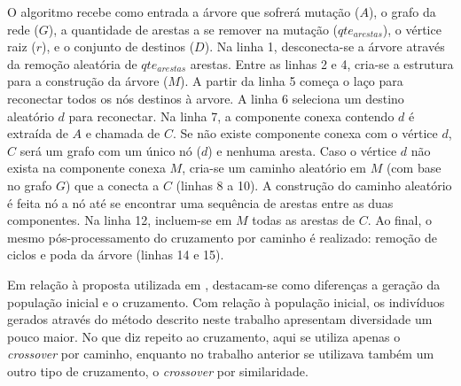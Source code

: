 O algoritmo recebe como entrada a árvore que sofrerá mutação ($A$), o grafo da rede ($G$), a quantidade de arestas a se remover na mutação ($qte_{arestas}$), o vértice raiz ($r$), e o conjunto de destinos ($D$). Na linha 1, desconecta-se a árvore através da remoção aleatória de $qte_{arestas}$ arestas. Entre as linhas 2 e 4, cria-se a estrutura para a construção da árvore ($M$). A partir da linha 5 começa o laço para reconectar todos os nós destinos à arvore. A linha 6 seleciona um destino aleatório $d$ para reconectar. Na linha 7, a componente conexa contendo $d$ é extraída de $A$ e chamada de $C$. Se não existe componente conexa com o vértice $d$, $C$ será um grafo com um único nó ($d$) e nenhuma aresta. Caso o vértice $d$ não exista na componente conexa $M$, cria-se um caminho aleatório em $M$ (com base no grafo $G$) que a conecta a $C$ (linhas 8 a 10). A construção do caminho aleatório é feita nó a nó até se encontrar uma sequência de arestas entre as duas componentes. Na linha 12, incluem-se em $M$ todas as arestas de $C$. Ao final, o mesmo pós-processamento do cruzamento por caminho é realizado: remoção de ciclos e poda da árvore (linhas 14 e 15).

Em relação à proposta utilizada em \cite{LafetaThesis}, destacam-se como diferenças a geração da população inicial e o cruzamento. Com relação à população inicial, os indivíduos gerados através do método descrito neste trabalho apresentam diversidade um pouco maior. No que diz repeito ao cruzamento, aqui se utiliza apenas o \textit{crossover} por caminho, enquanto no trabalho anterior se utilizava também um outro tipo de cruzamento, o \textit{crossover} por similaridade.